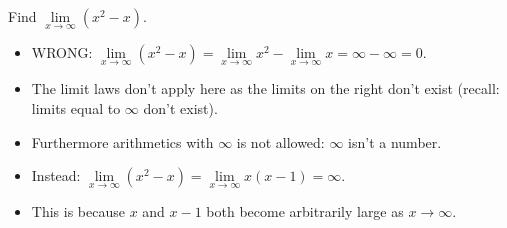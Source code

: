 \begin{frame}
\begin{example}
Find $\lim\limits_{x\rightarrow \infty}(x^2-x)$.
\begin{itemize}
\item<2-| alert@2->  WRONG: $\lim\limits_{x\to\infty} (x^2-x) = \lim\limits_{x\to\infty}x^2-\lim\limits_{x\to\infty} x = \infty-\infty = 0$.
\item<3->  The limit laws don't apply here as the limits on the right don't exist (recall: limits equal to $\infty$ don't exist).  \item<4-> Furthermore arithmetics with $\infty$ is not allowed: $\infty$ isn't a number.
\item<5->  Instead: $\lim\limits_{x\to \infty} (x^2-x) = \lim\limits_{x\to\infty}x(x-1) = \infty$.
\item<6->  This is because $x$ and $x-1$ both become arbitrarily large as $x\to\infty$.
\end{itemize}
\end{example}
\end{frame}
